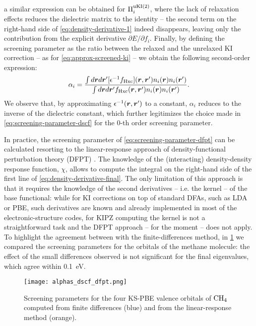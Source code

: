 %
a similar expression can be obtained for $\Pi_i^{\rm uKI(2)}$, where the lack of relaxation effects reduces the dielectric matrix to the identity -- the second term on the right-hand side of \cref{eq:density-derivative-1} indeed disappears, leaving only the contribution from the explicit derivative $\partial E / \partial f_i$. Finally, by defining the screening parameter as the ratio between the relaxed and the unrelaxed KI correction -- as for \cref{eq:approx-screened-ki} -- we obtain the following second-order expression:
%
\begin{equation}
    \alpha_i = \frac{\int d{\bm r} d{\bm r}' [\epsilon^{-1} f_{\rm Hxc}]({\bm r},{\bm r}') n_i({\bm r}) n_i({\bm r}')}{\int d{\bm r} d{\bm r}' f_{\rm Hxc}({\bm r},{\bm r}') n_i({\bm r}) n_i({\bm r}')} .
    \label{eq:screening-parameter-dfpt}
\end{equation}
%
We observe that, by approximating $\epsilon^{-1}({\bm r},{\bm r}')$ to a constant, $\alpha_i$ reduces to the inverse of the dielectric constant, which further legitimizes the choice made in \cref{eq:screening-parameter-dscf} for the 0-th order screening parameter.

In practice, the screening parameter of \cref{eq:screening-parameter-dfpt} can be calculated resorting to the linear-response approach of density-functional perturbation theory (DFPT) \cite{colonna_screening_2018}. The knowledge of the (interacting) density-density response function, $\chi$, allows to compute the integral on the right-hand side of the first line of \cref{eq:density-derivative-final}. The only limitation of this approach is that it requires the knowledge of the second derivatives -- i.e. the kernel -- of the base functional: while for KI corrections on top of standard DFAs, such as LDA or PBE, such derivatives are known and already implemented in most of the electronic-structure codes, for KIPZ computing the kernel is not a straightforward task and the DFPT approach -- for the moment -- does not apply. To highlight the agreement between with the finite-differences method, in \cref{fig:alphas-dscf-dfpt} we compared the screening parameters for the orbitals of the methane molecule: the effect of the small differences observed is not significant for the final eigenvalues, which agree within 0.1~eV. 

\begin{figure}
    \centering
    \texttt{[image: alphas\_dscf\_dfpt.png]}
    \caption[Comparison of screening parameters from $\Delta$SCF and DFPT]{Screening parameters for the four KS-PBE valence orbitals of ${\rm CH}_4$ computed from finite differences (blue) and from the linear-response method (orange).}
    \label{fig:alphas-dscf-dfpt}
\end{figure}

